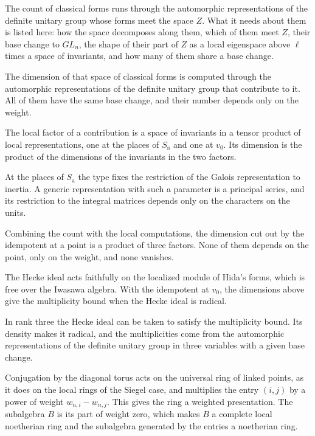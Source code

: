 The count of classical forms runs through the automorphic representations of the definite unitary group whose forms meet the space $Z$. What it needs about them is listed here: how the space decomposes along them, which of them meet $Z$, their base change to $GL_n$, the shape of their part of $Z$ as a local eigenspace above $\ell$ times a space of invariants, and how many of them share a base change.

The dimension of that space of classical forms is computed through the automorphic representations of the definite unitary group that contribute to it. All of them have the same base change, and their number depends only on the weight.

The local factor of a contribution is a space of invariants in a tensor product of local representations, one at the places of $S_{\mathrm a}$ and one at $v_0$. Its dimension is the product of the dimensions of the invariants in the two factors.

At the places of $S_{\mathrm a}$ the type fixes the restriction of the Galois representation to inertia. A generic representation with such a parameter is a principal series, and its restriction to the integral matrices depends only on the characters on the units.

Combining the count with the local computations, the dimension cut out by the idempotent at a point is a product of three factors. None of them depends on the point, only on the weight, and none vanishes.

The Hecke ideal acts faithfully on the localized module of Hida's forms, which is free over the Iwasawa algebra. With the idempotent at $v_0$, the dimensions above give the multiplicity bound when the Hecke ideal is radical.

In rank three the Hecke ideal can be taken to satisfy the multiplicity bound. Its density makes it radical, and the multiplicities come from the automorphic representations of the definite unitary group in three variables with a given base change.

Conjugation by the diagonal torus acts on the universal ring of linked points, as it does on the local rings of the Siegel case, and multiplies the entry $(i,j)$ by a power of weight $w_{n,i}-w_{n,j}$. This gives the ring a weighted presentation. The subalgebra $B$ is its part of weight zero, which makes $B$ a complete local noetherian ring and the subalgebra generated by the entries a noetherian ring.

